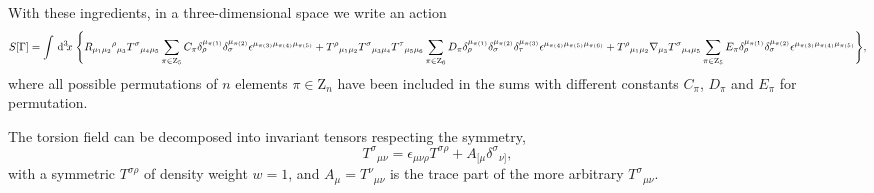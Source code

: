 \documentclass[twocolumn,aps,
  showpacs,showkeys,prd,superscriptaddress]{revtex4-1}
\begin{document}
\begin{widetext}
  With these ingredients, in a three-dimensional space we write an action 
  \begin{dmath}
    \label{accion3d}
    S[\Gamma] =
    \int \dn{3}{x}  \Bigg\{ R_{\mu_1\mu_2}{}^\rho{}_{\mu_3} T^\sigma{}_{\mu_4\mu_5} \sum_{\pi \in  \mathrm{Z}_5}C_\pi\delta_\rho^{\mu_{\pi(1)}} \delta_\sigma^{\mu_{\pi(2)}} \epsilon^{\mu_{\pi(3)}\mu_{\pi(4)}\mu_{\pi(5)}}  + T^\rho{}_{\mu_1\mu_2} T^\sigma{}_{\mu_3\mu_4} T^\tau{}_{\mu_5\mu_6} \sum_{\pi \in \mathrm{Z}_6}D_\pi\delta_\rho^{\mu_{\pi(1)}} \delta_\sigma^{\mu_{\pi(2)}}\delta_\tau^{\mu_{\pi(3)}}\epsilon^{\mu_{\pi(4)}\mu_{\pi(5)}\mu_{\pi(6)}} + T^\rho{}_{\mu_1\mu_2}\nabla_{\mu_3} T^\sigma{}_{\mu_4\mu_5}\sum_{\pi \in \mathrm Z_5}E_\pi\delta_\rho^{\mu_{\pi(1)}} \delta_\sigma^{\mu_{\pi(2)}}\epsilon^{\mu_{\pi(3)}\mu_{\pi(4)}\mu_{\pi(5)}} \Bigg\}, 
  \end{dmath}
  where all possible permutations of $n$ elements $\pi \in \mathrm{Z}_n$ have been included in the sums with  different constants $C_\pi$, $D_\pi$ and $E_\pi$ for  permutation. 
\end{widetext}

The torsion field can be decomposed into invariant tensors respecting the symmetry,
\begin{equation}
  T^\sigma{}_{\mu\nu} = \epsilon_{\mu\nu\rho} T^{\sigma\rho} + A_{[\mu}\delta^\sigma{}_{\nu]},
\end{equation}
with a symmetric $T^{\sigma\rho}$ of density weight  $w = 1$, and \mbox{$A_\mu = T^\nu{}_{\mu\nu}$} is the trace part of the more arbitrary $T^\sigma{}_{\mu\nu}$.
\end{document}
